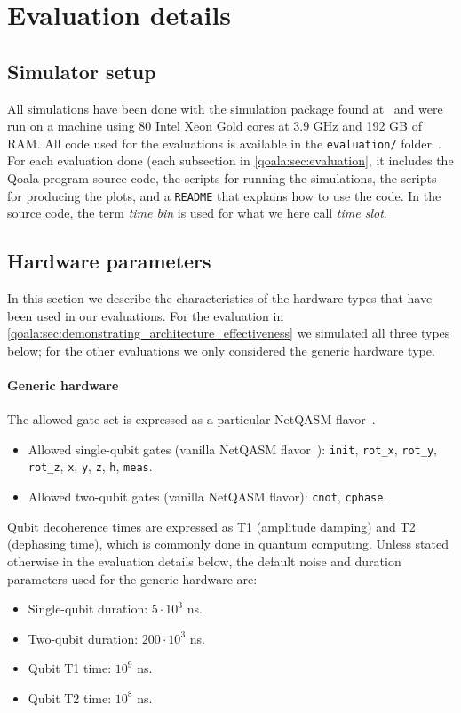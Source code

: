 \section{Evaluation details}
\label{qoala:sec:app:evaluation}

\subsection{Simulator setup}
All simulations have been done with the simulation package found at~\cite{qoala2023simulator}
and were run on a machine using 80 Intel Xeon Gold cores at 3.9 GHz and 192 GB of RAM.
All code used for the evaluations is available in the \texttt{evaluation/} folder~\cite{qoala2023simulator}.
For each evaluation done (each subsection in \cref{qoala:sec:evaluation}, it includes the Qoala program source code, the scripts for running the simulations, the scripts for producing the plots, and a \texttt{README} that explains how to use the code.
In the source code, the term \textit{time bin} is used for what we here call \textit{time slot}.

\subsection{Hardware parameters}
In this section we describe the characteristics of the hardware types that have been used in our evaluations.
For the evaluation in \cref{qoala:sec:demonstrating_architecture_effectiveness} we simulated all three types below;
for the other evaluations we only considered the generic hardware type.

\paragraph{Generic hardware}
The allowed gate set is expressed as a particular NetQASM flavor~\cite{dahlberg2022netqasm}.

\begin{itemize}
  \item Allowed single-qubit gates (vanilla NetQASM flavor~\cite{dahlberg2022netqasm}):
  \texttt{init}, \texttt{rot\_x}, \texttt{rot\_y}, \texttt{rot\_z}, \texttt{x}, \texttt{y}, \texttt{z}, \texttt{h}, \texttt{meas}.
  \item Allowed two-qubit gates (vanilla NetQASM flavor): \texttt{cnot}, \texttt{cphase}.
\end{itemize}

Qubit decoherence times are expressed as T1 (amplitude damping) and T2 (dephasing time), which is commonly done in quantum computing.
Unless stated otherwise in the evaluation details below, the default noise and duration parameters used for the generic hardware are:
\begin{itemize}
  \item Single-qubit duration: $5 \cdot 10^3$ ns.
  \item Two-qubit duration: $200 \cdot 10^3$ ns.
  \item Qubit T1 time: $10^9$ ns.
  \item Qubit T2 time: $10^8$ ns.
\end{itemize}


